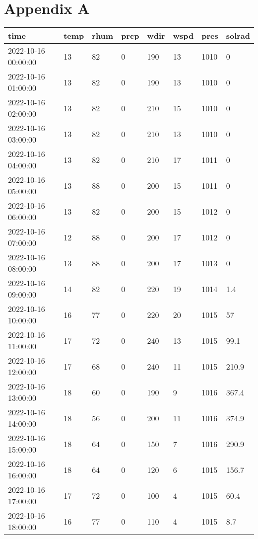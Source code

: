 \section{Appendix A}
\label{appendix}

\begin{longtable}{|l|l|l|l|l|l|l|l|}
    \hline
        time & temp & rhum & prcp & wdir & wspd & pres & solrad \\ \hline
        2022-10-16 00:00:00 & 13 & 82 & 0 & 190 & 13 & 1010 & 0 \\ \hline
        2022-10-16 01:00:00 & 13 & 82 & 0 & 190 & 13 & 1010 & 0 \\ \hline
        2022-10-16 02:00:00 & 13 & 82 & 0 & 210 & 15 & 1010 & 0 \\ \hline
        2022-10-16 03:00:00 & 13 & 82 & 0 & 210 & 13 & 1010 & 0 \\ \hline
        2022-10-16 04:00:00 & 13 & 82 & 0 & 210 & 17 & 1011 & 0 \\ \hline
        2022-10-16 05:00:00 & 13 & 88 & 0 & 200 & 15 & 1011 & 0 \\ \hline
        2022-10-16 06:00:00 & 13 & 82 & 0 & 200 & 15 & 1012 & 0 \\ \hline
        2022-10-16 07:00:00 & 12 & 88 & 0 & 200 & 17 & 1012 & 0 \\ \hline
        2022-10-16 08:00:00 & 13 & 88 & 0 & 200 & 17 & 1013 & 0 \\ \hline
        2022-10-16 09:00:00 & 14 & 82 & 0 & 220 & 19 & 1014 & 1.4 \\ \hline
        2022-10-16 10:00:00 & 16 & 77 & 0 & 220 & 20 & 1015 & 57 \\ \hline
        2022-10-16 11:00:00 & 17 & 72 & 0 & 240 & 13 & 1015 & 99.1 \\ \hline
        2022-10-16 12:00:00 & 17 & 68 & 0 & 240 & 11 & 1015 & 210.9 \\ \hline
        2022-10-16 13:00:00 & 18 & 60 & 0 & 190 & 9 & 1016 & 367.4 \\ \hline
        2022-10-16 14:00:00 & 18 & 56 & 0 & 200 & 11 & 1016 & 374.9 \\ \hline
        2022-10-16 15:00:00 & 18 & 64 & 0 & 150 & 7 & 1016 & 290.9 \\ \hline
        2022-10-16 16:00:00 & 18 & 64 & 0 & 120 & 6 & 1015 & 156.7 \\ \hline
        2022-10-16 17:00:00 & 17 & 72 & 0 & 100 & 4 & 1015 & 60.4 \\ \hline
        2022-10-16 18:00:00 & 16 & 77 & 0 & 110 & 4 & 1015 & 8.7 \\ \hline

\end{longtable}
